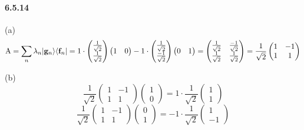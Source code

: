 \documentclass[a4paper]{article}
\begin{document}
\paragraph{6.5.14}
(a)
\[
\mathrm{A}=\sum_n\lambda_n|\mathbf{g}_n\rangle\langle\mathbf{f}_n|=1\cdot
\begin{pmatrix}
\frac{1}{\sqrt{2}}\\\frac{1}{\sqrt{2}}
\end{pmatrix}
\begin{pmatrix}
1&0
\end{pmatrix}-1\cdot
\begin{pmatrix}
\frac{1}{\sqrt{2}}\\\frac{-1}{\sqrt{2}}
\end{pmatrix}
\begin{pmatrix}
0&1
\end{pmatrix}=
\begin{pmatrix}
\frac{1}{\sqrt{2}}&\frac{-1}{\sqrt{2}}\\
\frac{1}{\sqrt{2}}&\frac{1}{\sqrt{2}}
\end{pmatrix}=
\frac{1}{\sqrt{2}}
\begin{pmatrix}
1&-1\\1&1
\end{pmatrix}
\]

(b) 
\[
\frac{1}{\sqrt{2}}\begin{pmatrix}
1&-1\\1&1
\end{pmatrix}
\begin{pmatrix}
1\\0
\end{pmatrix}=1\cdot\frac{1}{\sqrt{2}}
\begin{pmatrix}
1\\1
\end{pmatrix}
\]
\[
\frac{1}{\sqrt{2}}\begin{pmatrix}
1&-1\\1&1
\end{pmatrix}
\begin{pmatrix}
0\\1
\end{pmatrix}=-1\cdot\frac{1}{\sqrt{2}}
\begin{pmatrix}
1\\-1
\end{pmatrix}
\]
\end{document}
